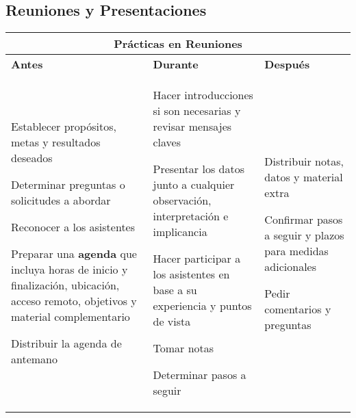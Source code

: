 \subsection{Reuniones y Presentaciones}
\begin{table}
    \centering
    \begin{tabular}{|p{4.8cm}|p{4.8cm}|p{4.7cm}}
        \hline
        \multicolumn{3}{|c|}{Prácticas en Reuniones} \\
        \hline
        \textbf{Antes} & \textbf{Durante}  &\textbf{Después} \\
        \hline
        \begin{description}
            \item {Establecer propósitos, metas y resultados deseados}
            \item {Determinar preguntas o solicitudes a abordar}
            \item {Reconocer a los asistentes}
            \item {Preparar una \textbf{agenda} que incluya horas de inicio y finalización, ubicación, acceso remoto, objetivos y material complementario}
            \item {Distribuir la agenda de antemano}
        \end{description} & \begin{description}
            \item {Hacer introducciones si son necesarias y revisar mensajes claves}
            \item {Presentar los datos junto a cualquier observación, interpretación e implicancia}
            \item {Hacer participar a los asistentes en base a su experiencia y puntos de vista}
            \item {Tomar notas}
            \item {Determinar pasos a seguir}
        \end{description} &  \begin{description}
            \item {Distribuir notas, datos y material extra}
            \item {Confirmar pasos a seguir y plazos para medidas adicionales}
            \item {Pedir comentarios y preguntas}
        \end{description} \\
        \hline
    \end{tabular}
\end{table}

\newpage